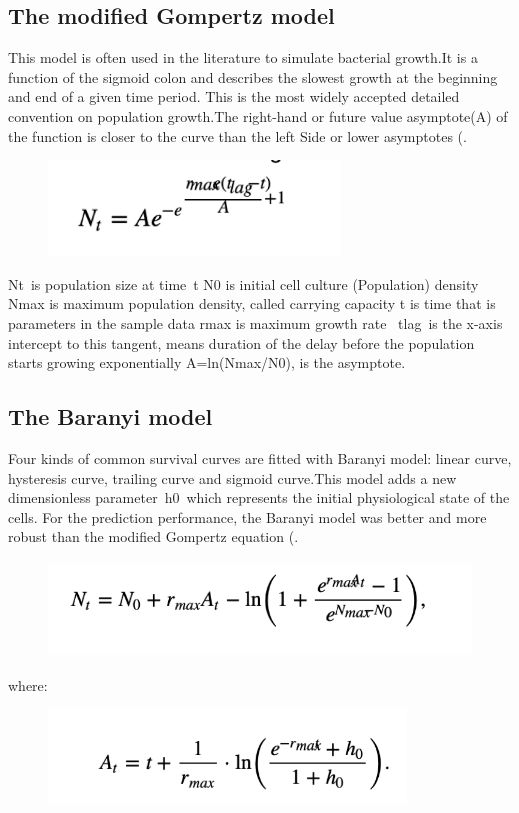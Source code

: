 \documentclass[11pt,a4 paper,title page]{article}
\begin{document}
    \subsection{The modified Gompertz model}
    
    This model is often used in the literature to simulate bacterial growth.It is a function of the sigmoid colon and describes the slowest growth at the beginning and end of a given time period. This is the most widely accepted detailed convention on population growth.The right-hand or future value asymptote(A) of the function is closer to the curve than the left Side or lower asymptotes (\cite{zwietering1990modeling}.
\begin{figure}[H]
\centering
\includegraphics[height=1in,angle=360]{../picture/figure2.png}
\end{figure}
\hfill\break
Nt is population size at time t
\hfill\break
N0 is initial cell culture (Population) density
\hfill\break
Nmax is maximum population density, called carrying capacity
\hfill\break
t is time that is parameters in the sample data
\hfill\break
rmax is maximum growth rate 
\hfill\break
tlag is the x-axis intercept to this tangent, means duration of the delay before the population starts growing exponentially
\hfill\break
A=ln(Nmax/N0), is the asymptote.


    \subsection{The Baranyi model}
    Four kinds of common survival curves are fitted with Baranyi model: linear curve, hysteresis curve, trailing curve and sigmoid curve.This model adds a new dimensionless parameter h0 which represents the initial physiological state of the cells. For the prediction performance, the Baranyi model was better and more robust than the modified Gompertz equation (\cite{xiong1999comparison}.
\begin{figure}[H]
\centering
\includegraphics[height=1in,angle=360]{../picture/figure3.png}
\end{figure}
    \hfill\break
    where:
    \begin{figure}[H]
\centering
\includegraphics[height=1in,angle=360]{../picture/figure4.png}
\end{figure}
\end{document}
